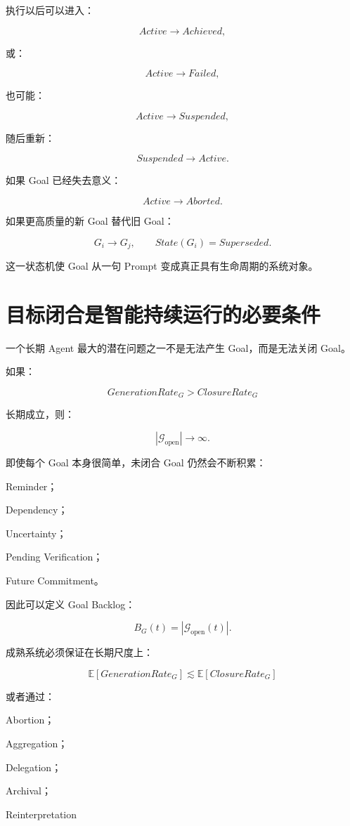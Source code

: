执行以后可以进入：

\[
Active
\rightarrow
Achieved,
\]

或：

\[
Active
\rightarrow
Failed,
\]

也可能：

\[
Active
\rightarrow
Suspended,
\]

随后重新：

\[
Suspended
\rightarrow
Active.
\]

如果 Goal 已经失去意义：

\[
Active
\rightarrow
Aborted.
\]

如果更高质量的新 Goal 替代旧 Goal：

\[
G_i
\rightarrow
G_j,
\qquad
State(G_i)=Superseded.
\]

这一状态机使 Goal 从一句 Prompt 变成真正具有生命周期的系统对象。


\section{目标闭合是智能持续运行的必要条件}

一个长期 Agent 最大的潜在问题之一不是无法产生 Goal，而是无法关闭 Goal。

如果：

\[
GenerationRate_G
>
ClosureRate_G
\]

长期成立，则：

\[
|\mathcal G_{\mathrm{open}}|
\rightarrow
\infty.
\]

即使每个 Goal 本身很简单，未闭合 Goal 仍然会不断积累：

Reminder；

Dependency；

Uncertainty；

Pending Verification；

Future Commitment。

因此可以定义 Goal Backlog：

\[
B_G(t)
=
|\mathcal G_{\mathrm{open}}(t)|.
\]

成熟系统必须保证在长期尺度上：

\[
\boxed{
\mathbb E[
GenerationRate_G
]
\lesssim
\mathbb E[
ClosureRate_G
]
}
\]

或者通过：

Abortion；

Aggregation；

Delegation；

Archival；

Reinterpretation


